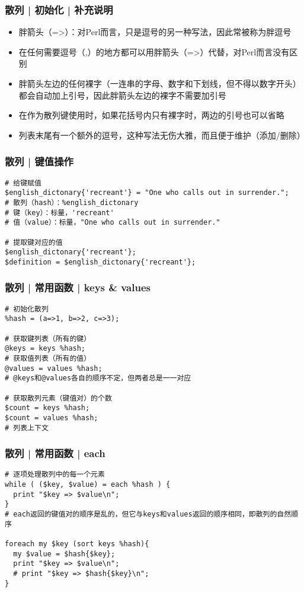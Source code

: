 \begin{frame}
  \frametitle{散列 | 初始化 | \alert{补充说明}}
  \begin{itemize}
    \item 胖箭头（=>）：对Perl而言，只是逗号的另一种写法，因此常被称为胖逗号
    \item 在任何需要逗号（,）的地方都可以用胖箭头（=>）代替，对Perl而言没有区别
    \item 胖箭头左边的任何裸字（一连串的字母、数字和下划线，但不得以数字开头）都会自动加上引号，因此胖箭头左边的裸字不需要加引号
    \item 在作为散列键使用时，如果花括号内只有裸字时，两边的引号也可以省略
    \item 列表末尾有一个额外的逗号，这种写法无伤大雅，而且便于维护（添加/删除）
  \end{itemize}
\end{frame}

\begin{frame}[fragile]
  \frametitle{散列 | \alert{键值操作}}
\begin{lstlisting}
# 给键赋值
$english_dictonary{'recreant'} = "One who calls out in surrender.";
# 散列（hash）：%english_dictonary
# 键（key）：标量，'recreant'
# 值（value）：标量，"One who calls out in surrender."

# 提取键对应的值
$english_dictonary{'recreant'};
$definition = $english_dictonary{'recreant'};
\end{lstlisting}
\end{frame}

\begin{frame}[fragile]
  \frametitle{散列 | \alert{常用函数} | keys \& values}
\begin{lstlisting}
# 初始化散列
%hash = (a=>1, b=>2, c=>3);

# 获取键列表（所有的键）
@keys = keys %hash;
# 获取值列表（所有的值）
@values = values %hash;
# @keys和@values各自的顺序不定，但两者总是一一对应

# 获取散列元素（键值对）的个数
$count = keys %hash;
$count = values %hash;
# 列表上下文
\end{lstlisting}
\end{frame}

\begin{frame}[fragile]
  \frametitle{散列 | \alert{常用函数} | each}
\begin{lstlisting}
# 逐项处理散列中的每一个元素
while ( ($key, $value) = each %hash ) {
  print "$key => $value\n";
}
# each返回的键值对的顺序是乱的，但它与keys和values返回的顺序相同，即散列的自然顺序

foreach my $key (sort keys %hash){
  my $value = $hash{$key};
  print "$key => $value\n";
  # print "$key => $hash{$key}\n";
}
\end{lstlisting}
\end{frame}

